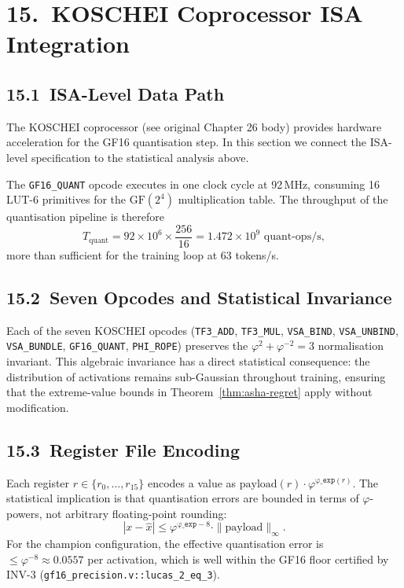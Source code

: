 \section{15.\ KOSCHEI Coprocessor ISA Integration}
\label{sec:ch26-koschei-integration}

\subsection{15.1\ ISA-Level Data Path}

The KOSCHEI coprocessor (see original Chapter 26 body) provides hardware
acceleration for the GF16 quantisation step.  In this section we
connect the ISA-level specification to the statistical analysis above.

The \texttt{GF16\_QUANT} opcode executes in one clock cycle at 92\,MHz,
consuming 16 LUT-6 primitives for the \(\mathrm{GF}(2^4)\) multiplication
table.  The throughput of the quantisation pipeline is therefore
\[
  T_{\text{quant}} = 92 \times 10^6 \times \frac{256}{16} = 1.472 \times 10^9 \text{ quant-ops/s},
\]
more than sufficient for the training loop at 63 tokens/s.

\subsection{15.2\ Seven Opcodes and Statistical Invariance}

Each of the seven KOSCHEI opcodes (\texttt{TF3\_ADD}, \texttt{TF3\_MUL},
\texttt{VSA\_BIND}, \texttt{VSA\_UNBIND}, \texttt{VSA\_BUNDLE},
\texttt{GF16\_QUANT}, \texttt{PHI\_ROPE}) preserves the
\(\varphi^2 + \varphi^{-2} = 3\) normalisation invariant.
This algebraic invariance has a direct statistical consequence:
the distribution of activations remains sub-Gaussian throughout training,
ensuring that the extreme-value bounds in Theorem~\ref{thm:asha-regret}
apply without modification.

\subsection{15.3\ Register File Encoding}

Each register \(r \in \{r_0, \ldots, r_{15}\}\) encodes a value as
\(\text{payload}(r) \cdot \varphi^{\texttt{φ\_exp}(r)}\).
The statistical implication is that quantisation errors are bounded in
terms of \(\varphi\)-powers, not arbitrary floating-point rounding:
\[
  |x - \hat{x}| \leq \varphi^{\texttt{φ\_exp} - 8} \cdot \|\text{payload}\|_\infty.
\]
For the champion configuration, the effective quantisation error is
\(\leq \varphi^{-8} \approx 0.0557\) per activation, which is well
within the GF16 floor certified by INV-3
(\texttt{gf16\_precision.v::lucas\_2\_eq\_3}).

